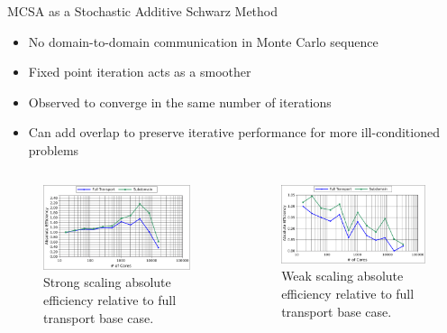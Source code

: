 \documentclass{beamer}
\begin{document}
\begin{frame}{MCSA as a Stochastic Additive Schwarz Method}

  \begin{itemize}
  \item No domain-to-domain communication in Monte Carlo sequence
    \smallskip
  \item Fixed point iteration acts as a smoother
    \smallskip
  \item Observed to converge in the same number of iterations
    \smallskip
  \item Can add overlap to preserve iterative performance for more
    ill-conditioned problems
  \end{itemize}

  \begin{columns}
    \begin{column}{0.5\textwidth}

      \begin{figure}[t!]
        \begin{center}
          \includegraphics[width=2.35in]{titan_strong_subdomain.pdf}
        \end{center}
        \caption{Strong scaling absolute efficiency relative to full
          transport base case.}
        \label{fig:titan_strong_subdomain}
      \end{figure}

    \end{column}

    \begin{column}{0.5\textwidth}

      \begin{figure}[t!]
        \begin{center}
          \includegraphics[width=2.35in]{titan_weak_subdomain.pdf}
        \end{center}
        \caption{Weak scaling absolute efficiency relative to full
          transport base case.}
        \label{fig:titan_weak_subdomain}
      \end{figure}

    \end{column}
  \end{columns}

\end{frame}
\end{document}
